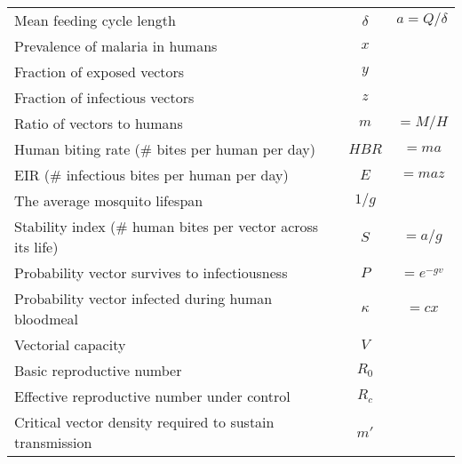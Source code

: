 \begin{table*}[h]
\begin{tabular}{l c c}
Mean feeding cycle length & $\delta$ & $a=Q/\delta$\\
Prevalence of malaria in humans & $x$ & \\
Fraction of exposed vectors & $y$ & \\
Fraction of infectious vectors & $z$ & \\
Ratio of vectors to humans & $m$ & $=M/H$ \\
Human biting rate (\# bites per human per day) & $HBR$ & $=ma$\\
EIR (\# infectious bites per human per day) & $E$ & $=maz$ \\
The average mosquito lifespan & $1/g$ & \\
Stability index (\# human bites per vector across its life) & $S$ & $=a/g$\\
Probability vector survives to infectiousness & $P$ & $=e^{-gv}$\\
Probability vector infected during human bloodmeal & $\kappa$ & $=cx$\\
Vectorial capacity & $V$ & \\
Basic reproductive number & $R_0$ & \\
Effective reproductive number under control & $R_c$ & \\
Critical vector density required to sustain transmission & $m'$ & \\
\hline%
\end{tabular}
\label{table:param}%
\end{table*}

